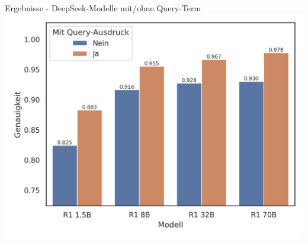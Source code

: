 \documentclass[aspectratio=169]{beamer} %
\begin{document}


\begin{frame}{Ergebnisse - DeepSeek-Modelle mit/ohne Query-Term}
    \centering
    \includegraphics[scale=0.65]{../datasets/sentiment140/results/plots/deepseek-genauigkeit-deepseek-modelle-einfluss-query-ausdruck-truncated-y-axis.png}
\end{frame}




\end{document}
